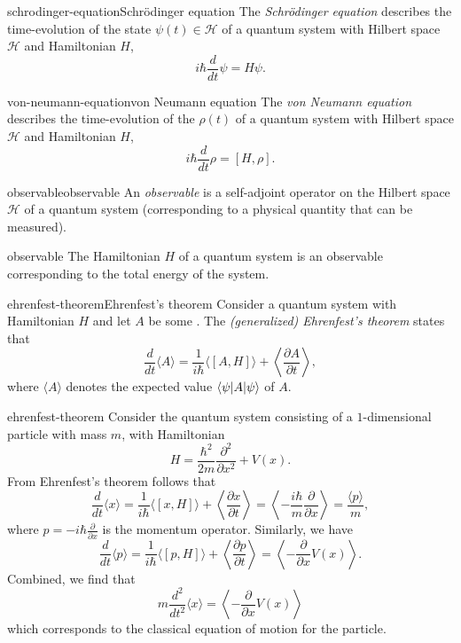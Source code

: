 \begin{topic}{schrodinger-equation}{Schrödinger equation}
    The \emph{Schrödinger equation} describes the time-evolution of the state $\psi(t) \in \mathcal{H}$ of a quantum system with Hilbert space $\mathcal{H}$ and Hamiltonian $H$,
    \[ i \hbar \frac{d}{dt} \psi = H \psi . \]
\end{topic}

\begin{topic}{von-neumann-equation}{von Neumann equation}
    The \emph{von Neumann equation} describes the time-evolution of the  $\rho(t)$ of a quantum system with Hilbert space $\mathcal{H}$ and Hamiltonian $H$,
    \[ i \hbar \frac{d}{dt} \rho = [H, \rho] . \]
\end{topic}

\begin{topic}{observable}{observable}
    An \emph{observable} is a self-adjoint operator on the Hilbert space $\mathcal{H}$ of a quantum system (corresponding to a physical quantity that can be measured).
\end{topic}

\begin{example}{observable}
    The Hamiltonian $H$ of a quantum system is an observable corresponding to the total energy of the system.
\end{example}

\begin{topic}{ehrenfest-theorem}{Ehrenfest's theorem}
    Consider a quantum system with Hamiltonian $H$ and let $A$ be some . The \emph{(generalized) Ehrenfest's theorem} states that 
    \[ \frac{d}{dt} \langle A \rangle = \frac{1}{i \hbar} \langle [A, H] \rangle + \left\langle \frac{\partial A}{\partial t} \right\rangle , \]
    where $\langle A \rangle$ denotes the expected value $\langle\psi| A |\psi\rangle$ of $A$.
\end{topic}

\begin{example}{ehrenfest-theorem}
    Consider the quantum system consisting of a $1$-dimensional particle with mass $m$, with Hamiltonian
    \[ H = \frac{\hbar^2}{2 m} \frac{\partial^2}{\partial x^2} + V(x) . \]
    From Ehrenfest's theorem follows that
    \[ \frac{d}{dt} \langle x \rangle = \frac{1}{i \hbar} \langle [x, H] \rangle + \left\langle \frac{\partial x}{\partial t} \right\rangle = \left\langle - \frac{i \hbar}{m} \frac{\partial}{\partial x} \right\rangle = \frac{\langle p \rangle}{m} , \]
    where $p = -i \hbar \frac{\partial}{\partial x}$ is the momentum operator. Similarly, we have
    \[ \frac{d}{dt} \langle p \rangle = \frac{1}{i \hbar} \langle [p, H] \rangle + \left\langle \frac{\partial p}{\partial t} \right\rangle = \left\langle - \frac{\partial}{\partial x} V(x) \right\rangle . \]
    Combined, we find that
    \[ m \frac{d^2}{d t^2} \langle x \rangle = \left\langle - \frac{\partial}{\partial x} V(x) \right\rangle \]
    which corresponds to the classical equation of motion for the particle.
\end{example}

